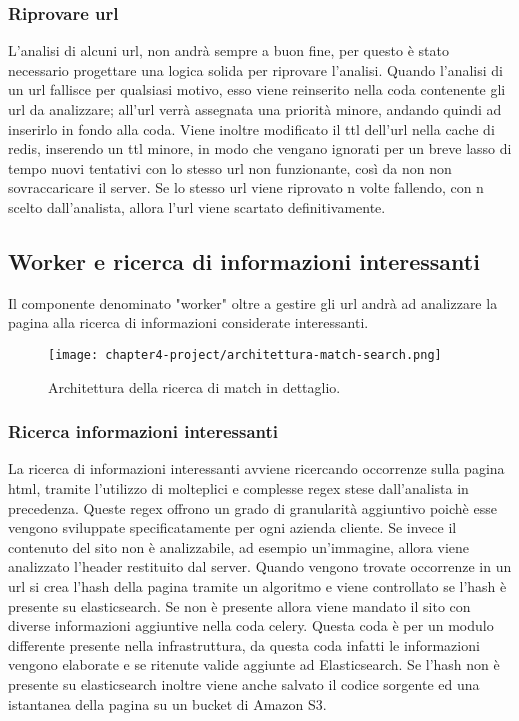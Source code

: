 \subsubsection{Riprovare url}

L'analisi di alcuni url, non andrà sempre a buon fine, per questo è stato necessario progettare una logica solida per riprovare l'analisi. Quando l'analisi di un url fallisce per qualsiasi motivo, esso viene reinserito nella coda contenente gli url da analizzare; all'url verrà assegnata una priorità minore, andando quindi ad inserirlo in fondo alla coda. Viene inoltre modificato il ttl dell'url nella cache di redis, inserendo un ttl minore, in modo che vengano ignorati per un breve lasso di tempo nuovi tentativi con lo stesso url non funzionante, così da non non sovraccaricare il server. Se lo stesso url viene riprovato n volte fallendo, con n scelto dall'analista, allora l'url viene scartato definitivamente.


\subsection{Worker e ricerca di informazioni interessanti}

Il componente denominato "worker" oltre a gestire gli url andrà ad analizzare la pagina alla ricerca di informazioni considerate interessanti.
\begin{figure}[!h] 
    \centering 
    \texttt{[image: chapter4-project/architettura-match-search.png]} 
    \caption{Architettura della ricerca di match in dettaglio.}
\end{figure}

\subsubsection{Ricerca informazioni interessanti}

La ricerca di informazioni interessanti avviene ricercando occorrenze sulla pagina html, tramite l'utilizzo di molteplici e complesse regex stese dall'analista in precedenza. Queste regex offrono un grado di granularità aggiuntivo poichè esse vengono sviluppate specificatamente per ogni azienda cliente. Se invece il contenuto del sito non è analizzabile, ad esempio un'immagine, allora viene analizzato l'header restituito dal server. Quando vengono trovate occorrenze in un url si crea l'hash della pagina tramite un algoritmo e viene controllato se l'hash è presente su elasticsearch. Se non è presente allora viene mandato il sito con diverse informazioni aggiuntive nella coda celery. Questa coda è per un modulo differente presente nella infrastruttura, da questa coda infatti le informazioni vengono elaborate e se ritenute valide aggiunte ad Elasticsearch. \newline{}
Se l'hash non è presente su elasticsearch inoltre viene anche salvato il codice sorgente ed una istantanea della pagina su un bucket di Amazon S3.

